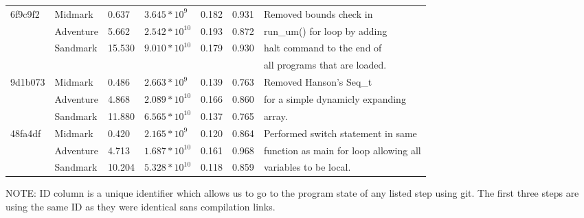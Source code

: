 \documentclass[fleqn]{article}
\begin{document}
\begin{center}
\begin{tabular}{ l  l  l  l l l l }
    6f9c9f2 & Midmark   & 0.637 & $3.645*10^{9}$ & 0.182 & 0.931 & Removed bounds check in \\ 
       & Adventure & 5.662 & $2.542*10^{10}$ & 0.193 & 0.872 & run\_um() for loop by adding \\
       & Sandmark  & 15.530 & $9.010*10^{10}$ & 0.179 & 0.930 & halt command to the end of\\
       &   &  &  &  &  & all programs that are loaded. \\ \hline 
    9d1b073 & Midmark   & 0.486 & $2.663*10^{9}$ & 0.139 & 0.763 & Removed Hanson's Seq\_t \\ 
       & Adventure & 4.868 & $2.089*10^{10}$ & 0.166 & 0.860 & for a simple dynamicly expanding\\
       & Sandmark  & 11.880 & $6.565*10^{10}$ & 0.137 & 0.765 & array. \\ \hline 
    48fa4df & Midmark   & 0.420 & $2.165*10^{9}$ & 0.120 & 0.864 & Performed switch statement in same \\ 
       & Adventure & 4.713 & $1.687*10^{10}$ & 0.161 & 0.968 & function as main for loop allowing all\\
       & Sandmark  & 10.204 & $5.328*10^{10}$ & 0.118 & 0.859 & variables to be local.\\ \hline 


    \end{tabular}
\end{center}

NOTE: ID column is a unique identifier which allows us to go to the program state of any listed step using git. The first three steps are using the same ID as they were identical sans compilation links.
\end{document}
